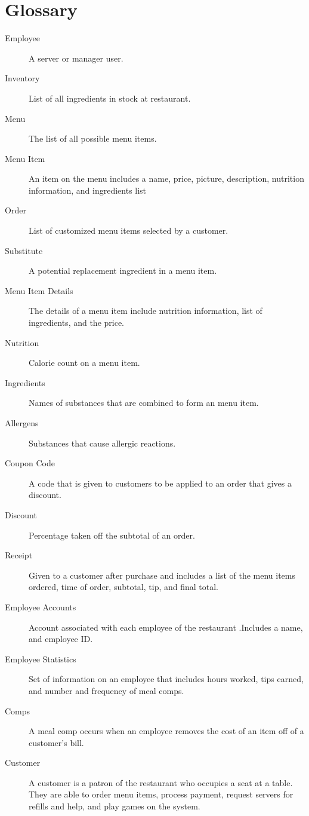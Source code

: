 \documentclass[12pt]{article}
\begin{document}
	\section{Glossary}
		\begin{description}
			\item[Employee] 			A server or manager user.
			\item[Inventory] 			List of all ingredients in stock at restaurant.
			\item[Menu] 				The list of all possible menu items.
			\item[Menu Item] 			An item on the menu includes a name, price, picture, description, nutrition information, and ingredients list
			\item[Order] 				List of customized menu items selected by a customer.
			\item[Substitute] 			A potential replacement ingredient in a menu item.
			\item[Menu Item Details] 	The details of a menu item include nutrition information, list of ingredients, and the price.
			\item[Nutrition] 			Calorie count on a menu item.
			\item[Ingredients]			Names of substances that are combined to form an menu item.
			\item[Allergens]			Substances that cause allergic reactions.
			\item[Coupon Code]			A code that is given to customers to be applied to an order that gives a discount.
			\item[Discount]				Percentage taken off the subtotal of an order.
			\item[Receipt]				Given to a customer after purchase and includes a list of the menu items ordered, time of order, subtotal, tip, and final total.
			\item[Employee Accounts]	Account associated with each employee of the restaurant .Includes a name, and employee ID.
			\item[Employee Statistics]	Set of information on an employee that includes hours worked, tips earned, and number and frequency of meal comps.
			\item[Comps]				A meal comp occurs when an employee removes the cost of an item off of a customer's bill.
			\item[Customer]				A customer is a patron of the restaurant who occupies a seat at a table. They are able to order menu items, process payment, request servers for refills and help, and play games on the system.

\end{description}
\end{document}
